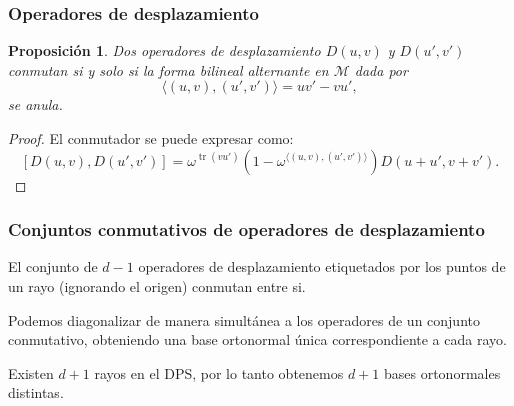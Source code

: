 \documentclass[10pt,spanish]{beamer}
\DeclareMathOperator{\tr}{tr}
\newtheorem{proposition}{Proposición}
\begin{document}
  \begin{frame}
    \frametitle{Operadores de desplazamiento}

    \begin{proposition}
      Dos operadores de desplazamiento $D(u,v)$ y $D(u',v')$
      conmutan si y solo si la forma bilineal alternante en
      $\mathcal M$ dada por
      \begin{equation}
        \langle (u,v), (u',v') \rangle
        = uv' - vu',
      \end{equation}
      se anula.
    \end{proposition}

    \pause

    \begin{proof}
      El conmutador se puede expresar como:
      \begin{equation}
        \left[
          D(u,v), D(u',v')
        \right]
        = \omega^{\tr(vu')} \left( 1 - \omega^{\langle (u,v),
        (u',v') \rangle} \right) D(u+u', v+v').
      \end{equation}
    \end{proof}
  \end{frame}

  \begin{frame}
    \frametitle{Conjuntos conmutativos de operadores de
    desplazamiento}

    El conjunto de $d-1$ operadores de desplazamiento
    etiquetados por los puntos de un rayo (ignorando el
    origen) conmutan entre si.
    
    \vspace{10pt}
    \pause
    
    Podemos diagonalizar de manera simultánea a los
    operadores de un conjunto conmutativo, obteniendo una
    base ortonormal única correspondiente a cada rayo.

    \vspace{10pt}
    \pause
    
    Existen $d + 1$ rayos en el DPS, por lo tanto obtenemos
    $d + 1$ bases ortonormales distintas.
  \end{frame}
\end{document}
